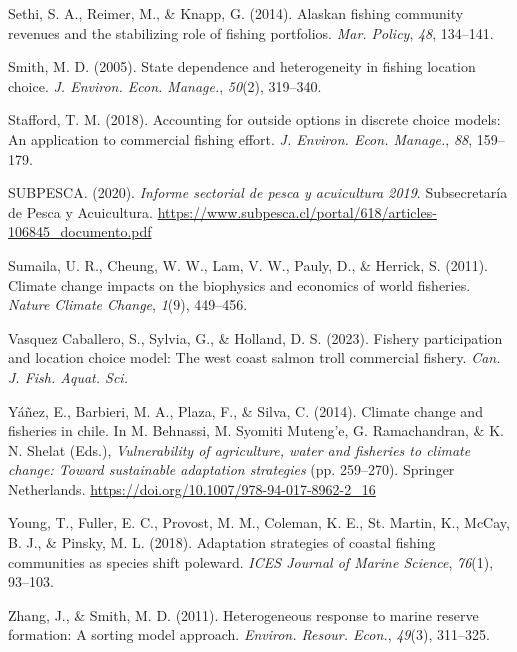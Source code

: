 \documentclass[
  11pt,
]{article}
\newlength{\cslhangindent}
\newenvironment{CSLReferences}[2] %
 {\begin{list}{}{%
  \setlength{\itemindent}{0pt}
  \setlength{\leftmargin}{0pt}
  \setlength{\parsep}{0pt}
  \ifodd #1
   \setlength{\leftmargin}{\cslhangindent}
   \setlength{\itemindent}{-1\cslhangindent}
  \fi
  \setlength{\itemsep}{#2\baselineskip}}}
 {\end{list}}
\begin{document}
\begin{CSLReferences}{1}{0}
Sethi, S. A., Reimer, M., \& Knapp, G. (2014). Alaskan fishing community revenues and the stabilizing role of fishing portfolios. \emph{Mar. Policy}, \emph{48}, 134--141.

Smith, M. D. (2005). State dependence and heterogeneity in fishing location choice. \emph{J. Environ. Econ. Manage.}, \emph{50}(2), 319--340.

Stafford, T. M. (2018). Accounting for outside options in discrete choice models: An application to commercial fishing effort. \emph{J. Environ. Econ. Manage.}, \emph{88}, 159--179.

SUBPESCA. (2020). \emph{Informe sectorial de pesca y acuicultura 2019}. Subsecretaría de Pesca y Acuicultura. \url{https://www.subpesca.cl/portal/618/articles-106845_documento.pdf}

Sumaila, U. R., Cheung, W. W., Lam, V. W., Pauly, D., \& Herrick, S. (2011). Climate change impacts on the biophysics and economics of world fisheries. \emph{Nature Climate Change}, \emph{1}(9), 449--456.

Vasquez Caballero, S., Sylvia, G., \& Holland, D. S. (2023). Fishery participation and location choice model: The west coast salmon troll commercial fishery. \emph{Can. J. Fish. Aquat. Sci.}

Yáñez, E., Barbieri, M. A., Plaza, F., \& Silva, C. (2014). Climate change and fisheries in chile. In M. Behnassi, M. Syomiti Muteng'e, G. Ramachandran, \& K. N. Shelat (Eds.), \emph{Vulnerability of agriculture, water and fisheries to climate change: Toward sustainable adaptation strategies} (pp. 259--270). Springer Netherlands. \url{https://doi.org/10.1007/978-94-017-8962-2_16}

Young, T., Fuller, E. C., Provost, M. M., Coleman, K. E., St. Martin, K., McCay, B. J., \& Pinsky, M. L. (2018). Adaptation strategies of coastal fishing communities as species shift poleward. \emph{ICES Journal of Marine Science}, \emph{76}(1), 93--103.

Zhang, J., \& Smith, M. D. (2011). Heterogeneous response to marine reserve formation: {A} sorting model approach. \emph{Environ. Resour. Econ.}, \emph{49}(3), 311--325.

\end{CSLReferences}
\end{document}
